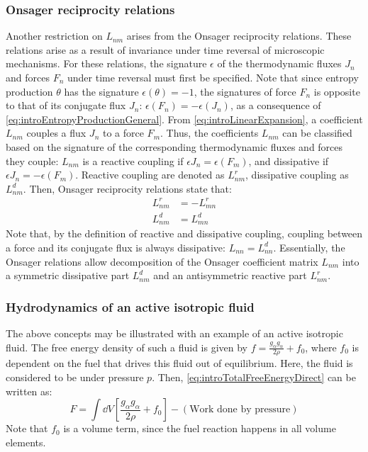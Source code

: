 \subsubsection{Onsager reciprocity relations}\label{subsubsec:introOnsager}
Another restriction on $L_{nm}$ arises from the Onsager reciprocity relations. These relations arise as a result of invariance under time reversal of microscopic mechanisms. For these relations, the signature $\epsilon$ of the thermodynamic fluxes $J_n$ and forces $F_n$ under time reversal must first be specified. Note that since entropy production $\theta$ has the signature $\epsilon(\theta) = -1$, the signatures of force $F_n$ is opposite to that of its conjugate flux $J_n$: $\epsilon(F_n) = -\epsilon(J_n)$, as a consequence of \autoref{eq:introEntropyProductionGeneral}. From \autoref{eq:introLinearExpansion}, a coefficient $L_{nm}$ couples a flux $J_n$ to a force $F_m$. Thus, the coefficients $L_{nm}$ can be classified based on the signature of the corresponding thermodynamic fluxes and forces they couple: $L_{nm}$ is a reactive coupling if $\epsilon{J_n} = \epsilon(F_m)$, and dissipative if $\epsilon{J_n} = -\epsilon(F_m)$. Reactive coupling are denoted as $L^r_{nm}$, dissipative coupling as $L^d_{nm}$. Then, Onsager reciprocity relations state that:
\begin{subequations}\label{eq:OnsagerRelations}
    \begin{align}
        L^r_{nm} &= -L^r_{mn}\\
        L^d_{nm} &= L^d_{mn}
    \end{align}
\end{subequations}
Note that, by the definition of reactive and dissipative coupling, coupling between a force and its conjugate flux is always dissipative: $L_{nn} = L^d_{nn}$. Essentially, the Onsager relations allow decomposition of the Onsager coefficient matrix $L_{nm}$ into a symmetric dissipative part $L^d_{nm}$ and an antisymmetric reactive part $L^r_{nm}$.

\subsubsection{Hydrodynamics of an active isotropic fluid}\label{subsubsec:introExampleSimpleIsotropicFluid}
The above concepts may be illustrated with an example of an active isotropic fluid. The free energy density of such a fluid is given by $f = \frac{g_\alpha g_\alpha}{2\rho} + f_0$, where $f_0$ is dependent on the fuel that drives this fluid out of equilibrium. Here, the fluid is considered to be under pressure $p$. Then, \autoref{eq:introTotalFreeEnergyDirect} can be written as:
\begin{equation}\label{eq:introActiveSimpleFluidFreeEnergyTotal}
    F = \int \dd{V} \left[\frac{g_\alpha g_\alpha}{2\rho} + f_0\right] - (\textrm{Work done by pressure})
\end{equation}
Note that $f_0$ is a volume term, since the fuel reaction happens in all volume elements. 

